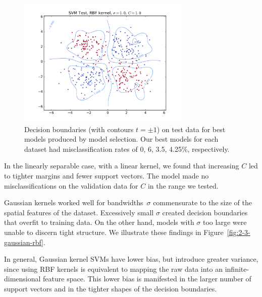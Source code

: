 \documentclass{article}
\begin{document}
\begin{multicols}{2}
\begin{figure}[t]
   \includegraphics[width=3.25in]{img/p2-3-d4-c1-rbf10/test.pdf}
   \caption{Decision boundaries (with contours $t = \pm1$)
       on test data for best models produced by model selection.
       Our best models for each dataset had misclassification rates of
       0, 6, 3.5, 4.25\%, respectively.
   }
   \label{fig:2-3-model-selection}
\end{figure}

In the linearly separable case, with a linear kernel,
we found that increasing $C$ led to tighter margins and fewer support vectors.
The model made no misclassifications on the validation data for $C$ in the range we tested.

Gaussian kernels worked well for bandwidths~$\sigma$
commensurate to the size of the spatial features of the dataset.
Excessively small $\sigma$ created decision boundaries that overfit to training data.
On the other hand, models with $\sigma$ too large were unable to discern tight structure.
We illustrate these findings in Figure~\ref{fig:2-3-gaussian-rbf}.

In general,
Gaussian kernel SVMs have lower bias,
but introduce greater variance,
since using RBF kernels is equivalent to
mapping the raw data into an infinite-dimensional feature space.
This lower bias is manifested
in the larger number of support vectors
and in the tighter shapes of the decision boundaries.


\end{multicols}
\end{document}
